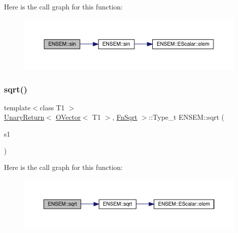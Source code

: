 Here is the call graph for this function\+:\nopagebreak
\begin{figure}[H]
\begin{center}
\leavevmode
\includegraphics[width=350pt]{da/d59/group__obsvector_ga3731f97921228d0d2c0ad3d05aa88985_cgraph}
\end{center}
\end{figure}
\mbox{\label{group__obsvector_gaf293f21cc7c65ebe881f87d5214c0e60}} 
\subsubsection{\texorpdfstring{sqrt()}{sqrt()}}
{\footnotesize\ttfamily template$<$class T1 $>$ \\
\mbox{\hyperlink{structENSEM_1_1UnaryReturn}{Unary\+Return}}$<$ \mbox{\hyperlink{classENSEM_1_1OVector}{O\+Vector}}$<$ T1 $>$, \mbox{\hyperlink{structENSEM_1_1FnSqrt}{Fn\+Sqrt}} $>$\+::Type\+\_\+t E\+N\+S\+E\+M\+::sqrt (\begin{DoxyParamCaption}\item[{const \mbox{\hyperlink{classENSEM_1_1OVector}{O\+Vector}}$<$ T1 $>$ \&}]{s1 }\end{DoxyParamCaption})\hspace{0.3cm}{\ttfamily [inline]}}

Here is the call graph for this function\+:\nopagebreak
\begin{figure}[H]
\begin{center}
\leavevmode
\includegraphics[width=350pt]{da/d59/group__obsvector_gaf293f21cc7c65ebe881f87d5214c0e60_cgraph}
\end{center}
\end{figure}
\mbox{\label{group__obsvector_gaea84ad793fea0a58204b33a7bcee51b4}} 

